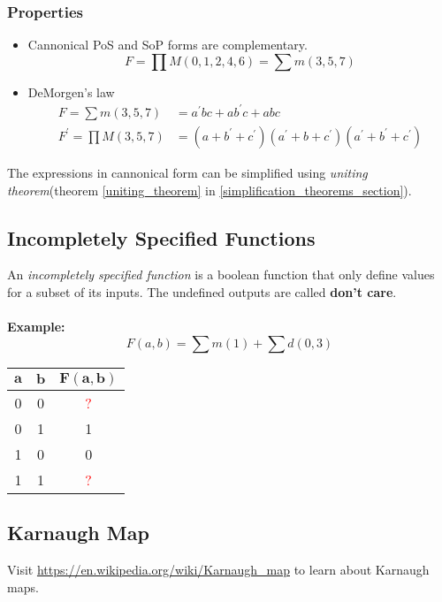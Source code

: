 \documentclass[oneside]{book}
\begin{document}
\subsubsection{Properties}
\begin{itemize}
	\item Cannonical PoS and SoP forms are complementary.
	      \[
		      F = \prod M(0, 1, 2, 4, 6) = \sum m(3, 5, 7)
	      \]
	\item DeMorgen's law
	      \begin{align*}
		      F = \sum m(3, 5, 7)         & = a^\prime bc + ab^\prime c + abc                                                    \\
		      F^\prime = \prod M(3, 5, 7) & = (a + b^\prime + c^\prime)(a^\prime + b + c^\prime)(a^\prime + b^\prime + c^\prime)
	      \end{align*}
\end{itemize}
The expressions in cannonical form can be simplified using \textit{uniting theorem}(theorem \ref{uniting_theorem} in \cref{simplification_theorems_section}).

\subsection{Incompletely Specified Functions}
An \textit{incompletely specified function} is a boolean function that only define values for a subset of its inputs. The undefined outputs are called \textbf{don't care}.\cite{incompletely_specified_function}
\\\\
\textbf{Example:}
\[
	F(a, b) = \sum m(1) + \sum d(0, 3)
\]
\begin{table}[ht]
	\centering
	\begin{tabular}{|cc|c|}
		\hline
		$\mathbf{a}$ & $\mathbf{b}$ & $\mathbf{F(a, b)}$ \\
		\hline
		0            & 0            & \textcolor{red}{?} \\
		0            & 1            & 1                  \\
		1            & 0            & 0                  \\
		1            & 1            & \textcolor{red}{?} \\
		\hline
	\end{tabular}
\end{table}

\subsection{Karnaugh Map}
Visit \url{https://en.wikipedia.org/wiki/Karnaugh_map} to learn about Karnaugh maps. \cite{karnaugh_map_wiki}
\end{document}
